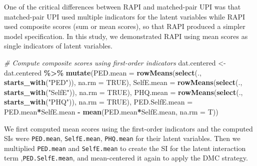\documentclass[
  man]{apa7}
\newenvironment{Shaded}{\begin{snugshade}}{\end{snugshade}}
\newcommand{\AttributeTok}[1]{\textcolor[rgb]{0.13,0.29,0.53}{#1}}
\newcommand{\CommentTok}[1]{\textcolor[rgb]{0.56,0.35,0.01}{\textit{#1}}}
\newcommand{\ConstantTok}[1]{\textcolor[rgb]{0.56,0.35,0.01}{#1}}
\newcommand{\FunctionTok}[1]{\textcolor[rgb]{0.13,0.29,0.53}{\textbf{#1}}}
\newcommand{\NormalTok}[1]{#1}
\newcommand{\OtherTok}[1]{\textcolor[rgb]{0.56,0.35,0.01}{#1}}
\newcommand{\SpecialCharTok}[1]{\textcolor[rgb]{0.81,0.36,0.00}{\textbf{#1}}}
\newcommand{\StringTok}[1]{\textcolor[rgb]{0.31,0.60,0.02}{#1}}
\begin{document}
One of the critical differences between RAPI and matched-pair UPI was that matched-pair UPI used multiple indicators for the latent variables while RAPI used composite scores (sum or mean scores), so that RAPI produced a simpler model specification. In this study, we demonstrated RAPI using mean scores as single indicators of latent variables.

\begin{Shaded}
\begin{Highlighting}[]
\CommentTok{\# Compute composite scores using first{-}order indicators}
\NormalTok{dat.centered }\OtherTok{\textless{}{-}}\NormalTok{ dat.centered }\SpecialCharTok{\%\textgreater{}\%}
  \FunctionTok{mutate}\NormalTok{(}\AttributeTok{PED.mean =} \FunctionTok{rowMeans}\NormalTok{(}\FunctionTok{select}\NormalTok{(., }\FunctionTok{starts\_with}\NormalTok{(}\StringTok{"PED"}\NormalTok{)), }\AttributeTok{na.rm =} \ConstantTok{TRUE}\NormalTok{),}
         \AttributeTok{SelfE.mean =} \FunctionTok{rowMeans}\NormalTok{(}\FunctionTok{select}\NormalTok{(., }\FunctionTok{starts\_with}\NormalTok{(}\StringTok{"SelfE"}\NormalTok{)), }\AttributeTok{na.rm =} \ConstantTok{TRUE}\NormalTok{),}
         \AttributeTok{PHQ.mean =} \FunctionTok{rowMeans}\NormalTok{(}\FunctionTok{select}\NormalTok{(., }\FunctionTok{starts\_with}\NormalTok{(}\StringTok{"PHQ"}\NormalTok{)), }\AttributeTok{na.rm =} \ConstantTok{TRUE}\NormalTok{),}
         \AttributeTok{PED.SelfE.mean =}\NormalTok{ PED.mean}\SpecialCharTok{*}\NormalTok{SelfE.mean }\SpecialCharTok{{-}} \FunctionTok{mean}\NormalTok{(PED.mean}\SpecialCharTok{*}\NormalTok{SelfE.mean, }\AttributeTok{na.rm =}\NormalTok{ T))}
\end{Highlighting}
\end{Shaded}

We first computed mean scores using the first-order indicators and the computed SIs were \texttt{PED.mean}, \texttt{SelfE.mean}, \texttt{PHQ.mean} for their latent variables. Then we multiplied \texttt{PED.mean} and \texttt{SelfE.mean} to create the SI for the latent interaction term ,\texttt{PED.SelfE.mean}, and mean-centered it again to apply the DMC strategy.
\end{document}
